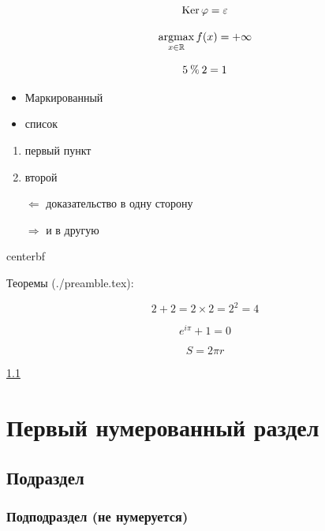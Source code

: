 \[
  \operatorname{Ker} \varphi = \varepsilon
\]

\[
  \operatorname*{argmax}_{x \in \mathbb{R}}f(x) = +\infty
\]

\[
  5 \mathbin{\%} 2 = 1
\]


\begin{itemize}
  \item Маркированный
  \item список
\end{itemize}

\begin{enumerate}
  \item первый пункт
  \item второй
\end{enumerate}

\begin{itemize}
  \item[$ \Leftarrow $] доказательство в одну сторону
  \item[$ \Rightarrow $] и в другую
\end{itemize}

\begin{centerbf}
  centerbf
\end{centerbf}


Теоремы (./preamble.tex):
\begin{lemma}
  \[ 2 + 2 = 2 \times 2 = 2^2 = 4 \]
\end{lemma}

\begin{theorem}
  \[ e^{i \pi} + 1 = 0 \]
\end{theorem}

\begin{theorem}
  \[ S = 2 \pi r \]
\end{theorem}

\ref{subsect} %

\section{Первый нумерованный раздел}
\subsection{Подраздел}
\label{subsect} %
\subsubsection{Подподраздел (не нумеруется)}

